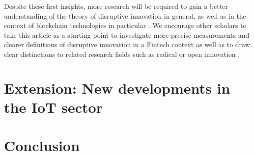 Despite these first insights, more research will be required to gain a better understanding 
of the theory of disruptive innovation in general, as well as in the context of 
blockchain technologies in particular \parencite[cf.]{ISI:000222662900002}. We encourage other 
scholars to take this article as a starting point to investigate more precise measurements 
\parencite[cf.]{JPIM:JPIM176} and clearer definitions \parencite{JPIM:JPIM177} 
of disruptive innovation in a Fintech context as well as to draw clear distinctions 
to related research fields such as radical or open innovation \parencite[cf.]{ISI:000283729100005}. 

\section{Extension: New developments in the IoT sector}

\section{Conclusion}

